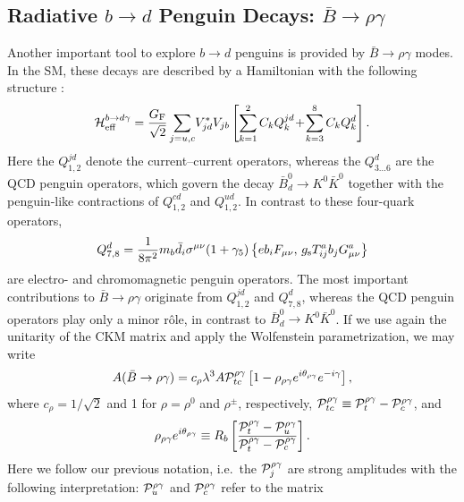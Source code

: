 \documentclass[11pt]{cernrep}
\begin{document}
\subsection{Radiative $b\to d$ Penguin Decays: 
$\bar B\to\rho\gamma$}\label{ssec:radiative}
\unboldmath
%
%
%
Another important tool to explore $b\to d$ penguins is
provided by $\bar B\to\rho\gamma$ modes.  In the SM, these decays 
are described by a Hamiltonian with the following 
structure \cite{B-LH98}:
\begin{equation}\label{Ham-bdgam}
{\cal H}_{\rm eff}^{b\to d\gamma}=\frac{G_{\rm F}}{\sqrt{2}}
\sum_{j=u,c} \! V_{jd}^\ast V_{jb}\left[\sum_{k=1}^{2}C_k Q_k^{jd}\!+\!
\sum_{k=3}^{8}C_k Q_k^{d}\right].
\end{equation}
Here the $Q_{1,2}^{jd}$ denote the current--current operators, whereas the 
$Q_{3\ldots 6}^{d}$ are the QCD penguin operators, which govern the
decay $\bar B^0_d\to  K^0\bar K^0$ together with the
penguin-like contractions of $Q_{1,2}^{cd}$ and $Q_{1,2}^{ud}$. In contrast 
to these four-quark operators,
\begin{equation}
Q_{7,8}^{d}=\frac{1}{8\pi^2}m_b\bar d_i \sigma^{\mu\nu}(1+\gamma_5)
\left\{e b_i F_{\mu\nu} ,\, g_{\rm s}T^a_{ij}b_j G^a_{\mu\nu} \right\}
\end{equation}
are electro- and chromomagnetic penguin operators. 
The most important contributions to $\bar B\to\rho\gamma$
originate from $Q_{1,2}^{jd}$ and $Q_{7,8}^{d}$, 
whereas the QCD penguin operators play only a minor r\^ole, in contrast 
to $\bar B^0_d\to K^0\bar K^0$. If we use again the
unitarity of the CKM matrix and apply the Wolfenstein parametrization,
we may write
\begin{equation}\label{Ampl-Brhogam}
A(\bar B \to \rho\gamma)=c_\rho \lambda^3 A {\cal P}_{tc}^{\rho\gamma}
\left[1-\rho_{\rho\gamma}e^{i\theta_{\rho\gamma}}e^{-i\gamma}\right],
\end{equation}
where $c_\rho=1/\sqrt{2}$ and 1 for $\rho=\rho^0$ and $\rho^\pm$,
respectively, ${\cal P}_{tc}^{\rho\gamma}\equiv
{\cal P}_t^{\rho\gamma}-{\cal P}_c^{\rho\gamma}$, and
\begin{equation}
\rho_{\rho\gamma}e^{i\theta_{\rho\gamma}}\equiv R_b\left[
\frac{{\cal P}_t^{\rho\gamma}-
{\cal P}_u^{\rho\gamma}}{{\cal P}_t^{\rho\gamma}-
{\cal P}_c^{\rho\gamma}}\right].
\end{equation}
Here we follow our previous notation, i.e.\ the ${\cal P}_j^{\rho\gamma}$ 
are strong amplitudes with the following interpretation: 
${\cal P}_u^{\rho\gamma}$ and ${\cal P}_c^{\rho\gamma}$ refer to the matrix 
\end{document}
